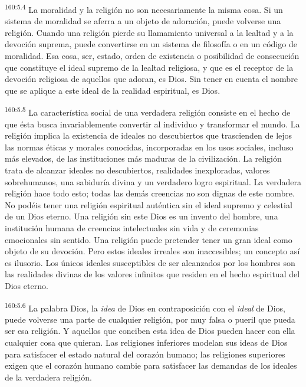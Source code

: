 \par 
\textsuperscript{160:5.4} La moralidad y la religión no son necesariamente la misma cosa. Si un sistema de moralidad se aferra a un objeto de adoración, puede volverse una religión. Cuando una religión pierde su llamamiento universal a la lealtad y a la devoción suprema, puede convertirse en un sistema de filosofía o en un código de moralidad. Esa cosa, ser, estado, orden de existencia o posibilidad de consecución que constituye el ideal supremo de la lealtad religiosa, y que es el receptor de la devoción religiosa de aquellos que adoran, es Dios. Sin tener en cuenta el nombre que se aplique a este ideal de la realidad espiritual, es Dios.

\par 
\textsuperscript{160:5.5} La característica social de una verdadera religión consiste en el hecho de que ésta busca invariablemente convertir al individuo y transformar el mundo. La religión implica la existencia de ideales no descubiertos que trascienden de lejos las normas éticas y morales conocidas, incorporadas en los usos sociales, incluso más elevados, de las instituciones más maduras de la civilización. La religión trata de alcanzar ideales no descubiertos, realidades inexploradas, valores sobrehumanos, una sabiduría divina y un verdadero logro espiritual. La verdadera religión hace todo esto; todas las demás creencias no son dignas de este nombre. No podéis tener una religión espiritual auténtica sin el ideal supremo y celestial de un Dios eterno. Una religión sin este Dios es un invento del hombre, una institución humana de creencias intelectuales sin vida y de ceremonias emocionales sin sentido. Una religión puede pretender tener un gran ideal como objeto de su devoción. Pero estos ideales irreales son inaccesibles; un concepto así es ilusorio. Los únicos ideales susceptibles de ser alcanzados por los hombres son las realidades divinas de los valores infinitos que residen en el hecho espiritual del Dios eterno.

\par 
\textsuperscript{160:5.6} La palabra Dios, la \textit{idea} de Dios en contraposición con el \textit{ideal} de Dios, puede volverse una parte de cualquier religión, por muy falsa o pueril que pueda ser esa religión. Y aquellos que conciben esta idea de Dios pueden hacer con ella cualquier cosa que quieran. Las religiones inferiores modelan sus ideas de Dios para satisfacer el estado natural del corazón humano; las religiones superiores exigen que el corazón humano cambie para satisfacer las demandas de los ideales de la verdadera religión.

